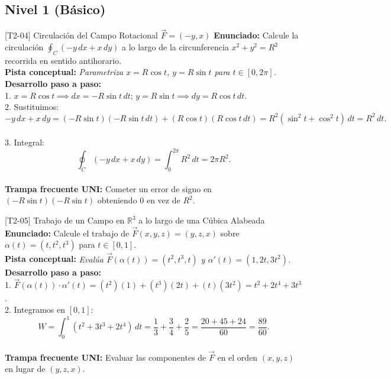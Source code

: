 \documentclass[11pt,a4paper]{article}
\begin{document}
\subsection{Nivel 1 (Básico)}

\begin{ejerciciobox}{[T2-04] Circulación del Campo Rotacional $\vec{F} = (-y, x)$}
\textbf{Enunciado:} Calcule la circulación $\oint_C (-y\,dx + x\,dy)$ a lo largo de la circunferencia $x^2 + y^2 = R^2$ recorrida en sentido antihorario.\\[0.2cm]
\textbf{Pista conceptual:} \emph{Parametriza $x = R\cos t$, $y = R\sin t$ para $t \in [0, 2\pi]$.}\\[0.2cm]
\textbf{Desarrollo paso a paso:}\\
1. $x = R\cos t \implies dx = -R\sin t\,dt$; $y = R\sin t \implies dy = R\cos t\,dt$.\\
2. Sustituimos:\\
$$-y\,dx + x\,dy = (-R\sin t)(-R\sin t\,dt) + (R\cos t)(R\cos t\,dt) = R^2(\sin^2 t + \cos^2 t)\,dt = R^2\,dt.$$\\
3. Integral:\\
$$\oint_C (-y\,dx + x\,dy) = \int_0^{2\pi} R^2\,dt = 2\pi R^2.$$\\[0.2cm]
\textbf{Trampa frecuente UNI:} Cometer un error de signo en $(-R\sin t)(-R\sin t)$ obteniendo $0$ en vez de $R^2$.
\end{ejerciciobox}

\begin{ejerciciobox}{[T2-05] Trabajo de un Campo en $\mathbb{R}^3$ a lo largo de una Cúbica Alabeada}
\textbf{Enunciado:} Calcule el trabajo de $\vec{F}(x,y,z) = (y, z, x)$ sobre $\alpha(t) = (t, t^2, t^3)$ para $t \in [0, 1]$.\\[0.2cm]
\textbf{Pista conceptual:} \emph{Evalúa $\vec{F}(\alpha(t)) = (t^2, t^3, t)$ y $\alpha'(t) = (1, 2t, 3t^2)$.}\\[0.2cm]
\textbf{Desarrollo paso a paso:}\\
1. $\vec{F}(\alpha(t))\cdot\alpha'(t) = (t^2)(1) + (t^3)(2t) + (t)(3t^2) = t^2 + 2t^4 + 3t^3$.\\
2. Integramos en $[0,1]$:\\
$$W = \int_0^1 (t^2 + 3t^3 + 2t^4)\,dt = \frac{1}{3} + \frac{3}{4} + \frac{2}{5} = \frac{20 + 45 + 24}{60} = \frac{89}{60}.$$\\[0.2cm]
\textbf{Trampa frecuente UNI:} Evaluar las componentes de $\vec{F}$ en el orden $(x,y,z)$ en lugar de $(y,z,x)$.
\end{ejerciciobox}
\end{document}
